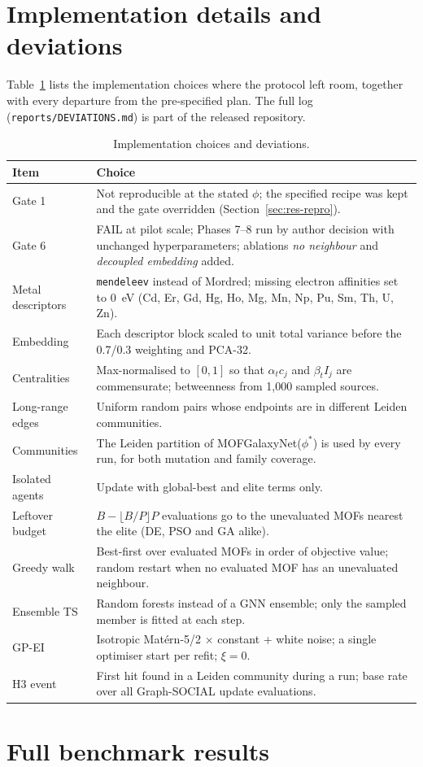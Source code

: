 \section{Implementation details and deviations}
\label{app:impl}

Table~\ref{tab:deviations} lists the implementation choices where the protocol left room, together with every departure from the pre-specified plan. The full log (\texttt{reports/DEVIATIONS.md}) is part of the released repository.

\begin{table}[h]
\centering
\caption{Implementation choices and deviations.}
\label{tab:deviations}
\footnotesize
\begin{tabular}{@{}p{3.2cm}p{10.3cm}@{}}
\toprule
Item & Choice \\
\midrule
Gate 1 & Not reproducible at the stated $\phi$; the specified recipe was kept and the gate overridden (Section~\ref{sec:res-repro}). \\
Gate 6 & FAIL at pilot scale; Phases 7--8 run by author decision with unchanged hyperparameters; ablations \textit{no neighbour} and \textit{decoupled embedding} added. \\
Metal descriptors & \texttt{mendeleev} instead of Mordred; missing electron affinities set to 0~eV (Cd, Er, Gd, Hg, Ho, Mg, Mn, Np, Pu, Sm, Th, U, Zn). \\
Embedding & Each descriptor block scaled to unit total variance before the 0.7/0.3 weighting and PCA-32. \\
Centralities & Max-normalised to $[0,1]$ so that $\alpha_t c_j$ and $\beta_t I_j$ are commensurate; betweenness from 1{,}000 sampled sources. \\
Long-range edges & Uniform random pairs whose endpoints are in different Leiden communities. \\
Communities & The Leiden partition of MOFGalaxyNet($\phi^\ast$) is used by every run, for both mutation and family coverage. \\
Isolated agents & Update with global-best and elite terms only. \\
Leftover budget & $B-\lfloor B/P\rfloor P$ evaluations go to the unevaluated MOFs nearest the elite (DE, PSO and GA alike). \\
Greedy walk & Best-first over evaluated MOFs in order of objective value; random restart when no evaluated MOF has an unevaluated neighbour. \\
Ensemble TS & Random forests instead of a GNN ensemble; only the sampled member is fitted at each step. \\
GP-EI & Isotropic Mat\'ern-5/2 $\times$ constant + white noise; a single optimiser start per refit; $\xi=0$. \\
H3 event & First hit found in a Leiden community during a run; base rate over all Graph-SOCIAL update evaluations. \\
\bottomrule
\end{tabular}
\end{table}

\section{Full benchmark results}
\label{app:full}
\begingroup\footnotesize
\setlength{\tabcolsep}{2pt}\scriptsize

\endgroup
